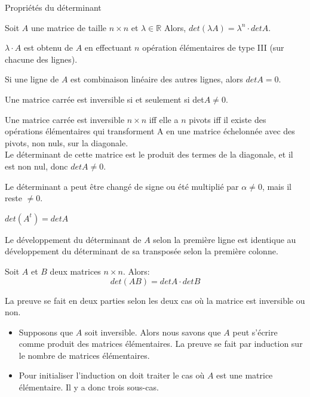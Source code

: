 \begin{parag}{Propriétés du déterminant}
    


Soit $A$ une matrice de taille $n \times n$ et $\lambda \in \mathbb{R}$ Alors, $det (\lambda A) = \lambda^n \cdot det A $.
\begin{preuve}
    $\lambda \cdot A$ est obtenu de $A$ en effectuant $n$ opération élémentaires de type III (sur chacune des lignes).
    \end{preuve}
    \begin{framedremark}
        Si une ligne de $A$ est combinaison linéaire des autres lignes, alors $det A = 0$.
    \end{framedremark}
    \begin{theoreme}
        Une matrice carrée est inversible si et seulement si det$A \neq 0$.
    \end{theoreme}
    \begin{preuve}
        Une matrice carrée est inversible $n\times n$ iff elle a $n$ pivots iff il existe des opérations élémentaires qui transforment A en une matrice échelonnée avec des pivots, non nuls, sur la diagonale.
        \\
        Le déterminant de cette matrice est le produit des termes de la diagonale, et il est non nul, donc $det A \neq 0$.
    \end{preuve}
    \begin{framedremark}
        Le déterminant a peut être changé de signe ou été multiplié par $\alpha \neq 0$, mais il reste $\neq 0$.
    \end{framedremark}
    
    \begin{theoreme}
        $det(A^t) = detA$
    \end{theoreme}
    \begin{preuve}
        Le développement du déterminant de $A$ selon la première ligne est identique au développement du déterminant de sa transposée selon la première colonne.
    \end{preuve}
    \begin{thm}
        Soit $A$ et $B$ deux matrices $n\times n$. Alors: 
        \\
        \[det(AB) = detA \cdot det B\]

    \end{thm}
    \begin{preuve}
        La preuve se fait en deux parties selon les deux cas où la matrice est inversible ou non.
        \begin{itemize}
            \item Supposons que $A$ soit inversible. Alors nous savons que $A$ peut s'écrire comme produit des matrices élémentaires. La preuve se fait par induction sur le nombre de matrices élémentaires.
            \item Pour initialiser l'induction on doit traiter le cas où $A$ est une matrice élémentaire. Il y a donc trois sous-cas.


\end{itemize}
\end{preuve}
\end{parag}
